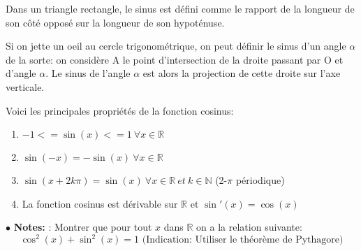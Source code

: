 \documentclass[a4paper]{article}
\theoremstyle{break}
\newcommand{\R}{\mathbb{R}}
\newcommand{\note}{$\bullet$ \textbf{Notes: }}
\begin{document}
Dans un triangle rectangle, le sinus est défini comme le rapport de la
longueur de son côté opposé sur la longueur de son hypoténuse. 

Si on jette un oeil au cercle trigonométrique, on peut définir le sinus d'un
angle $\alpha$ de la sorte: on considère A le point d'intersection de la droite
passant par O et d'angle $\alpha$. Le sinus de l'angle $\alpha$ est alors
la projection de cette droite sur l'axe verticale.

Voici les principales propriétés de la fonction cosinus:
\begin{enumerate}[label=(\alph*), leftmargin =2cm]
\item $-1 <= \sin(x) <= 1 ~ \forall x \in \R$
\item $\sin(-x) = -\sin(x) ~ \forall x \in \R$
\item $\sin(x+2k\pi) = \sin(x) ~ \forall x \in \R ~ et ~k \in \mathbb{N}$
  (2-$\pi$ périodique)
\item La fonction cosinus est dérivable sur $\R$ et $\sin'(x) = \cos(x)$
\end{enumerate}

\note: Montrer que pour tout $x$ dans $\R$ on a la relation suivante:
\[
  \cos^2(x) + \sin^2(x) = 1 \text{ (Indication: Utiliser le théorème de Pythagore)}
\]
\end{document}
